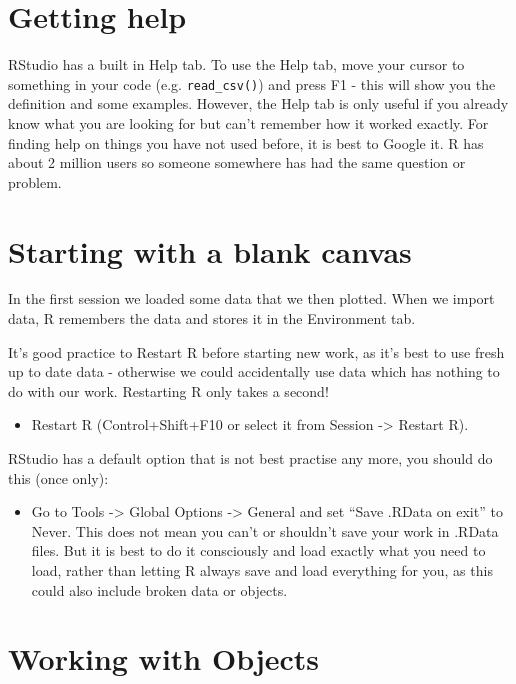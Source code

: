 \documentclass[]{book}
\providecommand{\tightlist}{%
  \setlength{\itemsep}{0pt}\setlength{\parskip}{0pt}}
\theoremstyle{definition}
\theoremstyle{definition}
\theoremstyle{definition}
\theoremstyle{remark}
\begin{document}
\section{Getting help}\label{getting-help}

RStudio has a built in Help tab. To use the Help tab, move your cursor
to something in your code (e.g. \texttt{read\_csv()}) and press F1 -
this will show you the definition and some examples. However, the Help
tab is only useful if you already know what you are looking for but
can't remember how it worked exactly. For finding help on things you
have not used before, it is best to Google it. R has about 2 million
users so someone somewhere has had the same question or problem.

\section{Starting with a blank
canvas}\label{starting-with-a-blank-canvas}

In the first session we loaded some data that we then plotted. When we
import data, R remembers the data and stores it in the Environment tab.

It's good practice to Restart R before starting new work, as it's best
to use fresh up to date data - otherwise we could accidentally use data
which has nothing to do with our work. Restarting R only takes a second!

\begin{itemize}
\tightlist
\item
  Restart R (Control+Shift+F10 or select it from Session -\textgreater{}
  Restart R).
\end{itemize}

RStudio has a default option that is not best practise any more, you
should do this (once only):

\begin{itemize}
\tightlist
\item
  Go to Tools -\textgreater{} Global Options -\textgreater{} General and
  set ``Save .RData on exit'' to Never. This does not mean you can't or
  shouldn't save your work in .RData files. But it is best to do it
  consciously and load exactly what you need to load, rather than
  letting R always save and load everything for you, as this could also
  include broken data or objects.
\end{itemize}

\section{Working with Objects}\label{working-with-objects}
\end{document}
